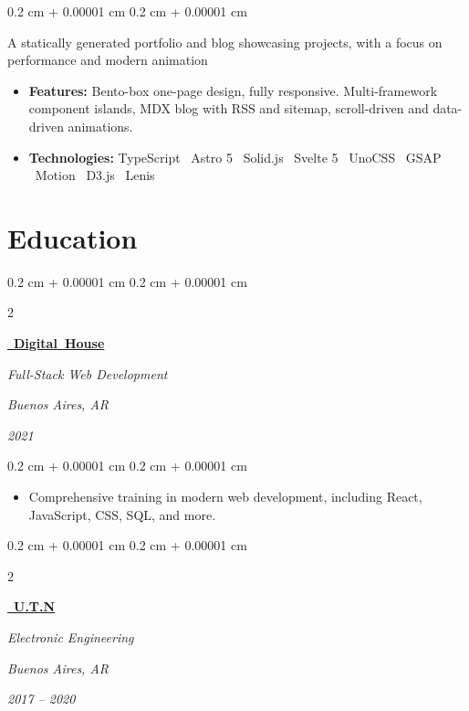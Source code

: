 \documentclass[10pt, letterpaper]{article}
\newenvironment{highlights}{
    \begin{itemize}[
        topsep=0.10 cm,
        parsep=0.10 cm,
        partopsep=0pt,
        itemsep=0pt,
        leftmargin=0.4 cm + 10pt
    ]
}{
    \end{itemize}
} %
\newenvironment{onecolentry}{
    \begin{adjustwidth}{
        0.2 cm + 0.00001 cm
    }{
        0.2 cm + 0.00001 cm
    }
}{
    \end{adjustwidth}
} %
\newenvironment{twocolentry}[2][]{
    \onecolentry
    \def\secondColumn{#2}
    \setcolumnwidth{\fill, 4.5 cm}
    \begin{paracol}{2}
}{
    \switchcolumn \raggedleft \secondColumn
    \end{paracol}
    \endonecolentry
} %
\let\hrefWithoutArrow\href
\renewcommand{\href}[2]{\hrefWithoutArrow{#1}{\ifthenelse{\equal{#2}{}}{ }{#2 }\raisebox{.15ex}{\footnotesize \faExternalLink*}}}
\begin{document}
        \begin{onecolentry}
            {A statically generated portfolio and blog showcasing projects, with a focus on performance and modern animation}
            \begin{highlights}
                \item \textbf{Features:} Bento-box one-page design, fully responsive. Multi-framework component islands, MDX blog with RSS and sitemap, scroll-driven and data-driven animations.
                \item \textbf{Technologies:}  TypeScript \textbar\ Astro 5 \textbar\ Solid.js \textbar\ Svelte 5 \textbar\ UnoCSS \textbar\ GSAP \textbar\ Motion \textbar\ D3.js \textbar\ Lenis
            \end{highlights}
        \end{onecolentry}


    \section{Education}

        \begin{twocolentry}{
            \textit{Buenos Aires, AR}

            \textit{2021}}
            \mbox{\hrefWithoutArrow{https://www.digitalhouse.com/} {\color{black} \hspace*{0.13cm}\textbf{Digital House}}}

            \textit{Full-Stack Web Development}
        \end{twocolentry}

        \vspace{0.10 cm}
        \begin{onecolentry}
            \begin{highlights}
                \item Comprehensive training in modern web development, including React, JavaScript, CSS, SQL, and more.
            \end{highlights}
        \end{onecolentry}

        \vspace{0.30 cm}

        \begin{twocolentry}{
            \textit{Buenos Aires, AR}

            \textit{2017 – 2020}}
            \mbox{\hrefWithoutArrow{https://utn.edu.ar/en} {\color{black} \hspace*{0.13cm}\textbf{U.T.N}}}

            \textit{Electronic Engineering}
        \end{twocolentry}
\end{document}
